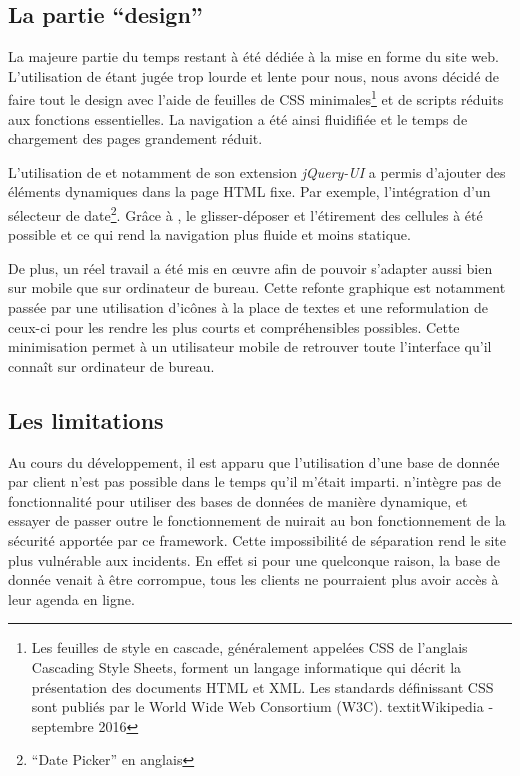 \documentclass[a4paper, 11pt]{report}
\begin{document}
    \subsection{La partie ``design''}
    La majeure partie du temps restant à été dédiée à la mise en forme du site web. L'utilisation de \bootstrap\cite{bootstrap} étant jugée trop lourde et lente pour nous, nous avons décidé de faire tout le design avec l'aide de feuilles de CSS minimales\footnote{Les feuilles de style en cascade, généralement appelées CSS de l'anglais Cascading Style Sheets, forment un langage informatique qui décrit la présentation des documents HTML et XML. Les standards définissant CSS sont publiés par le World Wide Web Consortium (W3C). textit{Wikipedia - septembre 2016}} et de scripts \js\cite{js} réduits aux fonctions essentielles. La navigation a été ainsi fluidifiée et le temps de chargement des pages grandement réduit.

    L'utilisation de \jq\cite{jquery} et notamment de son extension \textit{jQuery-UI} a permis d'ajouter des éléments dynamiques dans la page HTML fixe. Par exemple, l'intégration d'un sélecteur de date\footnote{``Date Picker'' en anglais}. Grâce à \jq, le glisser-déposer et l'étirement des cellules à été possible et ce qui rend la navigation plus fluide et moins statique.

    De plus, un réel travail a été mis en œuvre afin de pouvoir s'adapter aussi bien sur mobile que sur ordinateur de bureau. Cette refonte graphique est notamment passée par une utilisation d’icônes à la place de textes et une reformulation de ceux-ci pour les rendre les plus courts et compréhensibles possibles. Cette minimisation permet à un utilisateur mobile de retrouver toute l'interface qu'il connaît sur ordinateur de bureau.

    \subsection{Les limitations}
    Au cours du développement, il est apparu que l'utilisation d'une base de donnée par client n'est pas possible dans le temps qu'il m'était imparti. \symfony n'intègre pas de fonctionnalité pour utiliser des bases de données de manière dynamique, et essayer de passer outre le fonctionnement de \symfony nuirait au bon fonctionnement de la sécurité apportée par ce framework. Cette impossibilité de séparation rend le site plus vulnérable aux incidents. En effet si pour une quelconque raison, la base de donnée venait à être corrompue, tous les clients ne pourraient plus avoir accès à leur agenda en ligne.
\end{document}
